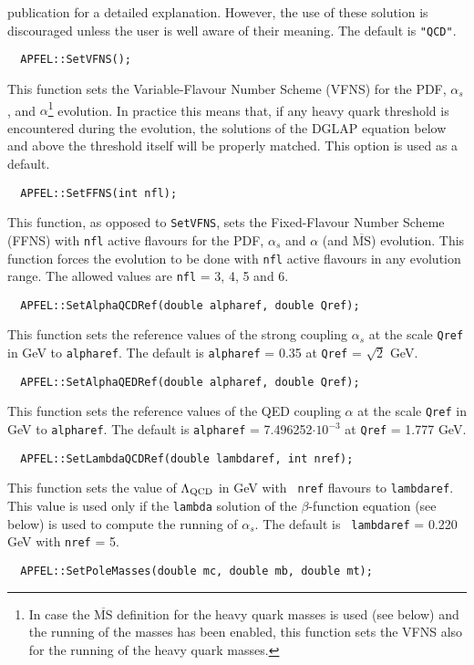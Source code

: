 \documentclass[11pt,a4paper]{article}
\begin{document}
publication for a detailed explanation. However, the use of these
solution is discouraged unless the user is well aware of their
meaning. The default is {\tt "QCD"}.
\begin{lstlisting}
  APFEL::SetVFNS();
\end{lstlisting}
This function sets the Variable-Flavour Number Scheme (VFNS) for the
PDF, $\alpha_s$, and $\alpha$\footnote{In case the
  $\overline{\mbox{MS}}$ definition for the heavy quark masses is used
  (see below) and the running of the masses has been enabled, this
  function sets the VFNS also for the running of the heavy quark
  masses.} evolution. In practice this means that, if any heavy quark
threshold is encountered during the evolution, the solutions of the
DGLAP equation below and above the threshold itself will be properly
matched. This option is used as a default.
\begin{lstlisting}
  APFEL::SetFFNS(int nfl);
\end{lstlisting}
This function, as opposed to {\tt SetVFNS}, sets the Fixed-Flavour
Number Scheme (FFNS) with {\tt nfl} active flavours for the PDF,
$\alpha_s$ and $\alpha$ (and $\overline{\mbox{MS}}$) evolution. This
function forces the evolution to be done with {\tt nfl} active
flavours in any evolution range. The allowed values are {\tt nfl} = 3,
4, 5 and 6.
\begin{lstlisting}
  APFEL::SetAlphaQCDRef(double alpharef, double Qref);
\end{lstlisting}
This function sets the reference values of the strong coupling
$\alpha_s$ at the scale {\tt Qref} in GeV to {\tt alpharef}. The
default is {\tt alpharef} = 0.35 at {\tt Qref} = $\sqrt{2}$ GeV.
\begin{lstlisting}
  APFEL::SetAlphaQEDRef(double alpharef, double Qref);
\end{lstlisting}
This function sets the reference values of the QED coupling $\alpha$
at the scale {\tt Qref} in GeV to {\tt alpharef}. The default is
{\tt alpharef} = 7.496252$\cdot 10^{-3}$ at {\tt Qref} = 1.777
GeV.
\begin{lstlisting}
  APFEL::SetLambdaQCDRef(double lambdaref, int nref);
\end{lstlisting}
This function sets the value of $\Lambda_{\rm QCD}$ in GeV with {\tt
  nref} flavours to {\tt lambdaref}. This value is used only if
the {\tt lambda} solution of the $\beta$-function equation (see below)
is used to compute the running of $\alpha_s$. The default is {\tt
  lambdaref} = 0.220 GeV with {\tt nref} = 5.
\begin{lstlisting}
  APFEL::SetPoleMasses(double mc, double mb, double mt);
\end{lstlisting}
\end{document}
